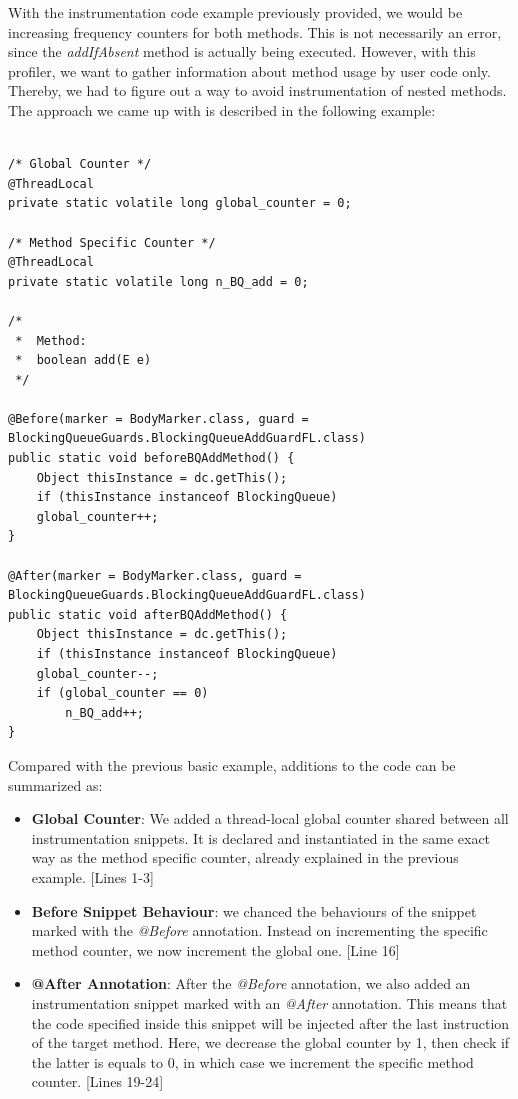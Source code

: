 \documentclass[]{usiinfthesis}
\begin{document}
\noindent
With the instrumentation code example previously provided, we would be increasing frequency counters for both methods. This is not necessarily an error, since the \textit{addIfAbsent} method is actually being executed. However, with this profiler, we want to gather information about method usage by user code only. Thereby, we had to figure out a way to avoid instrumentation of nested methods. The approach we came up with is described in the following example:



\vspace*{0.5cm}
\begin{verbatim}

/* Global Counter */
@ThreadLocal
private static volatile long global_counter = 0;

/* Method Specific Counter */
@ThreadLocal
private static volatile long n_BQ_add = 0;

/*
 *  Method:
 *  boolean add(E e)
 */

@Before(marker = BodyMarker.class, guard = BlockingQueueGuards.BlockingQueueAddGuardFL.class)
public static void beforeBQAddMethod() {
    Object thisInstance = dc.getThis();
    if (thisInstance instanceof BlockingQueue)
    global_counter++;
}

@After(marker = BodyMarker.class, guard = BlockingQueueGuards.BlockingQueueAddGuardFL.class)
public static void afterBQAddMethod() {
    Object thisInstance = dc.getThis();
    if (thisInstance instanceof BlockingQueue)
    global_counter--;
    if (global_counter == 0)
        n_BQ_add++;
}
\end{verbatim}
\vspace*{0.5cm}

Compared with the previous basic example, additions to the code can be summarized as:
\begin{itemize}
    \item \textbf{Global Counter}: We added a thread-local global counter shared between all instrumentation snippets. It is declared and instantiated in the same exact way as the method specific counter, already explained in the previous example. [Lines 1-3]
    \item \textbf{Before Snippet Behaviour}: we chanced the behaviours of the snippet marked with the \textit{@Before} annotation. Instead on incrementing the specific method counter, we now increment the global one. [Line 16]
    \item \textbf{@After Annotation}: After the \textit{@Before} annotation, we also added an instrumentation snippet marked with an \textit{@After} annotation. This means that the code specified inside this snippet will be injected after the last instruction of the target method. Here, we decrease the global counter by 1, then check if the latter is equals to 0, in which case we increment the specific method counter. [Lines 19-24]
\end{itemize}
\end{document}
